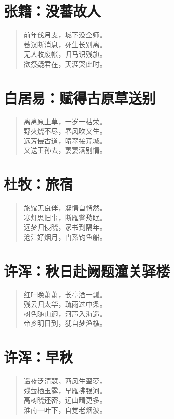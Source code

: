 \documentclass[12pt,oneside]{book}
\newenvironment{shici}{
\begin{verse}
\centering\large\hspace{12pt}}
{\end{verse}}
\begin{document}
\chapter{张籍：没蕃故人}
\begin{shici}
前年伐月支，城下没全师。\\
蕃汉断消息，死生长别离。\\
无人收废帐，归马识残旗。\\
欲祭疑君在，天涯哭此时。
\end{shici}

\chapter{白居易：赋得古原草送别}
\begin{shici}
离离原上草，一岁一枯荣。\\
野火烧不尽，春风吹又生。\\
远芳侵古道，晴翠接荒城。\\
又送王孙去，萋萋满别情。
\end{shici}

\chapter{杜牧：旅宿}
\begin{shici}
旅馆无良伴，凝情自悄然。\\
寒灯思旧事，断雁警愁眠。\\
远梦归侵晓，家书到隔年。\\
沧江好烟月，门系钓鱼船。
\end{shici}

\chapter{许浑：秋日赴阙题潼关驿楼}
\begin{shici}
红叶晚萧萧，长亭酒一瓢。\\
残云归太华，疏雨过中条。\\
树色随山迥，河声入海遥。\\
帝乡明日到，犹自梦渔樵。
\end{shici}

\chapter{许浑：早秋}
\begin{shici}
遥夜泛清瑟，西风生翠萝。\\
残萤栖玉露，早雁拂银河。\\
高树晓还密，远山晴更多。\\
淮南一叶下，自觉老烟波。
\end{shici}
\end{document}
